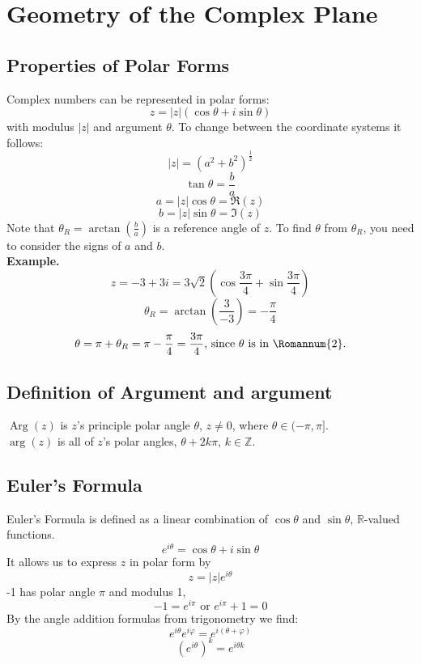 \documentclass[11pt]{article}
\begin{document}
\newpage
\section{Geometry of the Complex Plane}
\subsection{Properties of Polar Forms} 
Complex numbers can be represented in polar forms: 
$$z = |z|(\cos\theta + i\sin\theta)$$
with modulus $|z|$ and argument $\theta$. To change between the coordinate systems it follows: 
$$|z| = (a^2 + b^2)^{\frac{1}{2}}$$
$$\tan\theta = \frac{b}{a}$$
$$a = |z|\cos\theta= \Re(z)$$
$$b = |z|\sin\theta = \Im(z)$$
Note that $\theta_R = \arctan(\frac{b}{a})$ is a reference angle of $z$. To find $\theta$ from $\theta_R$, you need to consider the signs of $a$ and $b$. \\
\newline
\textbf{Example.} \\
$$z = -3 + 3i = 3\sqrt2(\cos\frac{3\pi}{4} + \sin\frac{3\pi}{4})$$
$$\theta_R = \arctan(\frac{3}{-3})= -\frac{\pi}{4}$$
\begin{equation*}
\theta = \pi + \theta_R = \pi -\frac{\pi}{4} = \frac{3\pi}{4} \mbox{, since } \theta \mbox{ is in } \Romannum{2} .
\end{equation*}
\subsection{Definition of Argument and argument}
$\operatorname{Arg}(z)$ is $z$'s principle polar angle $\theta$, $z \neq 0$, where $\theta \in (-\pi, \pi]$. \\
$\operatorname{arg}(z)$ is all of $z$'s polar angles, $\theta + 2k\pi$, $k \in \mathbb{Z}$. 

\subsection{Euler's Formula} 
Euler's Formula is defined as a linear combination of $\cos\theta$ and $\sin\theta$, $\mathbb{R}$-valued functions. 
$$ e^{i\theta}= \cos\theta + i\sin\theta $$
It allows us to express $z$ in polar form by 
$$ z = |z|e^{i\theta}$$
-1 has polar angle $\pi$ and modulus 1, 
\begin{equation*}
-1 = e^{i\pi} \mbox{ or } e^{i\pi} + 1 = 0
\end{equation*}
By the angle addition formulas from trigonometry we find: 
$$e^{i\theta}e^{i\varphi} = e^{i(\theta + \varphi)}$$
$$(e^{i\theta})^k = e^{i\theta k}$$
\end{document}
